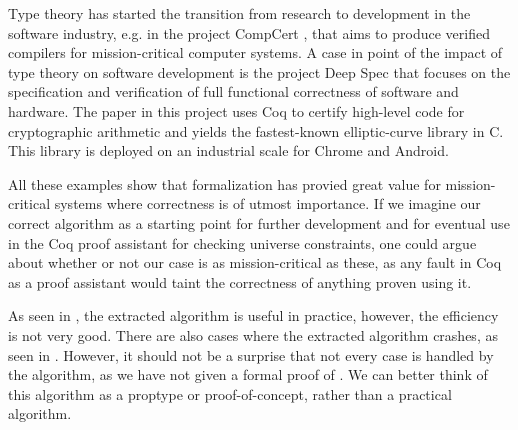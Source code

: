 Type theory has started the transition from research to development in
the software industry, e.g. in the project CompCert \cite{compcert},
that aims to produce verified compilers for mission-critical computer systems.
A case in point of the impact of type theory on software development is the project Deep Spec
\cite{deepspec} that focuses on the specification and verification of full functional
correctness of software and hardware. The paper \cite{secpriv} in this project uses Coq to certify high-level
code for cryptographic arithmetic and yields the fastest-known elliptic-curve library in C.
This library is deployed on an industrial scale for Chrome and Android.

All these examples show that formalization has provied great value for mission-critical
systems where correctness is of utmost importance.
If we imagine our correct algorithm as a starting point for further development
and for eventual use in the Coq proof assistant for checking universe constraints,
one could argue about whether or not our case is as mission-critical as these,
as any fault in Coq as a proof assistant would taint the correctness of anything proven using it.

As seen in , the extracted algorithm is useful in practice,
however, the efficiency is not very good.
There are also cases where the extracted algorithm crashes, as seen in .
However, it should not be a surprise that not every case is handled by the algorithm,
as we have not given a formal proof of .
We can better think of this algorithm as a proptype or proof-of-concept,
rather than a practical algorithm.
